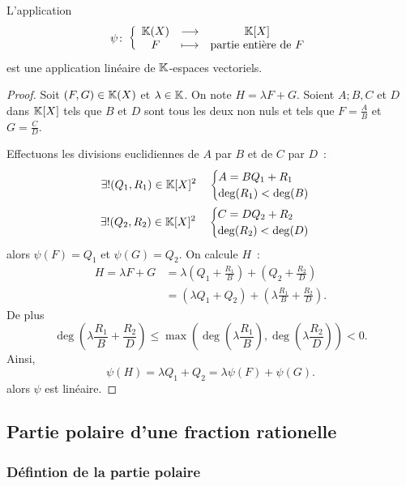 \begin{prop}
  L'application
  \begin{equation}
    \psi\colon \left\{\begin{array}{ccc} \mathbb{K}(X) & \longrightarrow &\mathbb{K}[X]\\ F & \longmapsto & \text{partie entière de } F \end{array} \right.
  \end{equation}
  est une application linéaire de $\mathbb{K}$-espaces vectoriels.
\end{prop}
\begin{proof}
  Soit $(F,G) \in \mathbb{K}(X)$ et $\lambda \in \mathbb{K}$. On note $H=\lambda F+G$. Soient $A;B,C$ et $D$ dans $\mathbb{K}[X]$ tels que $B$ et $D$ sont tous les deux non nuls et tels que $F=\frac{A}{B}$ et $G=\frac{C}{D}$.

  Effectuons les divisions euclidiennes de $A$ par $B$ et de $C$ par $D$~:
  \begin{align}
    \exists! (Q_1,R_1) \in \mathbb{K}[X]^2 \quad \begin{cases} A = BQ_1+R_1 \\ \deg(R_1) < \deg(B) \end{cases} \\ 
    \exists! (Q_2,R_2) \in \mathbb{K}[X]^2 \quad \begin{cases} C = DQ_2+R_2 \\ \deg(R_2) < \deg(D) \end{cases}
  \end{align}
  alors $\psi(F)=Q_1$ et $\psi(G)=Q_2$. On calcule $H$~:
  \begin{align}
    H = \lambda F+G &= \lambda\left(Q_1+\frac{R_1}{B}\right)+\left(Q_2+\frac{R_2}{D}\right) \\
    &=(\lambda Q_1 +Q_2) +\left(\lambda \frac{R_1}{B} +\frac{R_2}{D} \right).
  \end{align}
  De plus
  \begin{equation}
    \deg\left(\lambda \frac{R_1}{B} +\frac{R_2}{D} \right) \leq \max\left(\deg\left(\lambda \frac{R_1}{B}\right),\deg\left(\lambda \frac{R_2}{D}\right)\right) <0.
  \end{equation}
  Ainsi,
  \begin{equation}
    \psi(H)= \lambda Q_1+Q_2 = \lambda \psi(F)+\psi(G).
  \end{equation}
  alors $\psi$ est linéaire.
\end{proof}

\subsection{Partie polaire d'une fraction rationelle}

\subsubsection{Défintion de la partie polaire}


